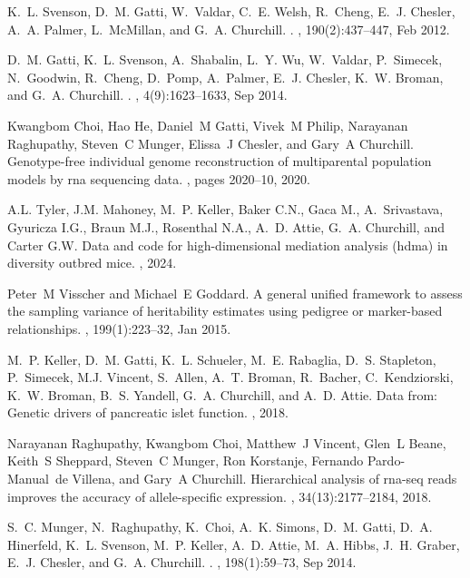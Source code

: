 \documentclass[
]{article}
\begin{document}
\begin{thebibliography}{100}
K.~L. Svenson, D.~M. Gatti, W.~Valdar, C.~E. Welsh, R.~Cheng, E.~J. Chesler,
  A.~A. Palmer, L.~McMillan, and G.~A. Churchill.
.
, 190(2):437--447, Feb 2012.

D.~M. Gatti, K.~L. Svenson, A.~Shabalin, L.~Y. Wu, W.~Valdar, P.~Simecek,
  N.~Goodwin, R.~Cheng, D.~Pomp, A.~Palmer, E.~J. Chesler, K.~W. Broman, and
  G.~A. Churchill.
.
, 4(9):1623--1633, Sep 2014.

Kwangbom Choi, Hao He, Daniel~M Gatti, Vivek~M Philip, Narayanan Raghupathy,
  Steven~C Munger, Elissa~J Chesler, and Gary~A Churchill.
\newblock Genotype-free individual genome reconstruction of multiparental
  population models by rna sequencing data.
, pages 2020--10, 2020.

A.L. Tyler, J.M. Mahoney, M.~P. Keller, Baker C.N., Gaca M., A.~Srivastava,
  Gyuricza I.G., Braun M.J., Rosenthal N.A., A.~D. Attie, G.~A. Churchill, and
  Carter G.W.
\newblock Data and code for high-dimensional mediation analysis (hdma) in
  diversity outbred mice.
, 2024.

Peter~M Visscher and Michael~E Goddard.
\newblock A general unified framework to assess the sampling variance of
  heritability estimates using pedigree or marker-based relationships.
, 199(1):223--32, Jan 2015.

M.~P. Keller, D.~M. Gatti, K.~L. Schueler, M.~E. Rabaglia, D.~S. Stapleton,
  P.~Simecek, M.J. Vincent, S.~Allen, A.~T. Broman, R.~Bacher, C.~Kendziorski,
  K.~W. Broman, B.~S. Yandell, G.~A. Churchill, and A.~D. Attie.
\newblock Data from: Genetic drivers of pancreatic islet function.
, 2018.

Narayanan Raghupathy, Kwangbom Choi, Matthew~J Vincent, Glen~L Beane, Keith~S
  Sheppard, Steven~C Munger, Ron Korstanje, Fernando Pardo-Manual~de Villena,
  and Gary~A Churchill.
\newblock Hierarchical analysis of rna-seq reads improves the accuracy of
  allele-specific expression.
, 34(13):2177--2184, 2018.

S.~C. Munger, N.~Raghupathy, K.~Choi, A.~K. Simons, D.~M. Gatti, D.~A.
  Hinerfeld, K.~L. Svenson, M.~P. Keller, A.~D. Attie, M.~A. Hibbs, J.~H.
  Graber, E.~J. Chesler, and G.~A. Churchill.
.
, 198(1):59--73, Sep 2014.


\end{thebibliography}
\end{document}
